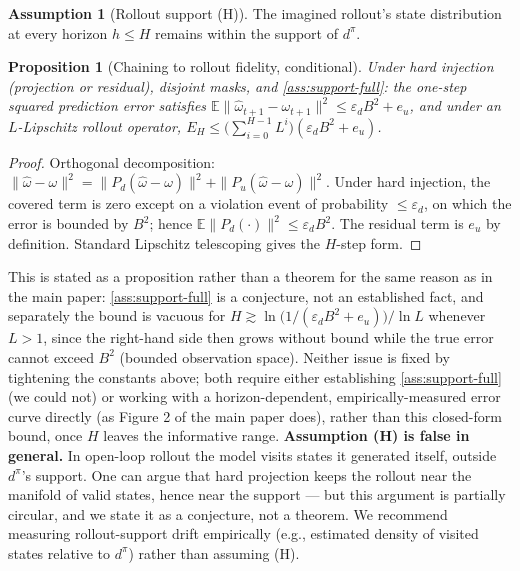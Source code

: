 \documentclass[11pt]{article}
\newcommand{\E}{\mathbb{E}}
\theoremstyle{plain}
\newtheorem{proposition}[theorem]{Proposition}
\theoremstyle{definition}
\newtheorem{assumption}{Assumption}[section] %
\theoremstyle{remark}
\begin{document}
\begin{assumption}[Rollout support (H)]
\label{ass:support-full}
The imagined rollout's state distribution at every horizon $h\le H$ remains within the support of $d^\pi$.
\end{assumption}

\begin{proposition}[Chaining to rollout fidelity, conditional]
\label{thm:t3-full}
Under hard injection (projection or residual), disjoint masks, and \autoref{ass:support-full}: the one-step squared prediction error satisfies $\E\|\hat\omega_{t+1}-\omega_{t+1}\|^2 \le \varepsilon_d B^2+e_u$, and under an $L$-Lipschitz rollout operator, $E_H\le\big(\sum_{i=0}^{H-1}L^i\big)(\varepsilon_d B^2+e_u)$.
\end{proposition}
\begin{proof}
Orthogonal decomposition: $\|\hat\omega-\omega\|^2=\|P_d(\hat\omega-\omega)\|^2+\|P_u(\hat\omega-\omega)\|^2$. Under hard injection, the covered term is zero except on a violation event of probability $\le\varepsilon_d$, on which the error is bounded by $B^2$; hence $\E\|P_d(\cdot)\|^2\le\varepsilon_d B^2$. The residual term is $e_u$ by definition. Standard Lipschitz telescoping gives the $H$-step form.
\end{proof}
This is stated as a proposition rather than a theorem for the same reason as in the main paper: \autoref{ass:support-full} is a conjecture, not an established fact, and separately the bound is vacuous for $H\gtrsim\ln\big(1/(\varepsilon_dB^2+e_u)\big)/\ln L$ whenever $L>1$, since the right-hand side then grows without bound while the true error cannot exceed $B^2$ (bounded observation space). Neither issue is fixed by tightening the constants above; both require either establishing \autoref{ass:support-full} (we could not) or working with a horizon-dependent, empirically-measured error curve directly (as Figure 2 of the main paper does), rather than this closed-form bound, once $H$ leaves the informative range.
\textbf{Assumption (H) is false in general.} In open-loop rollout the model visits states it generated itself, outside $d^\pi$'s support. One can argue that hard projection keeps the rollout near the manifold of valid states, hence near the support --- but this argument is partially circular, and we state it as a conjecture, not a theorem. We recommend measuring rollout-support drift empirically (e.g., estimated density of visited states relative to $d^\pi$) rather than assuming (H).
\end{document}
